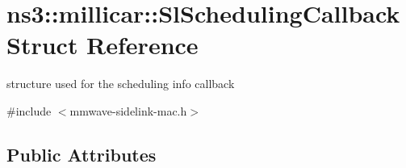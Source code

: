 \hypertarget{structns3_1_1millicar_1_1SlSchedulingCallback}{}\section{ns3\+:\+:millicar\+:\+:Sl\+Scheduling\+Callback Struct Reference}
\label{structns3_1_1millicar_1_1SlSchedulingCallback}


structure used for the scheduling info callback  




{\ttfamily \#include $<$mmwave-\/sidelink-\/mac.\+h$>$}

\subsection*{Public Attributes}
